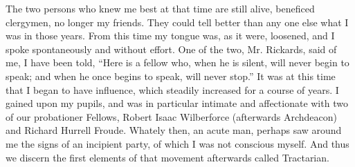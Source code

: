 The two persons who knew me best at that time are still alive,
beneficed clergymen, no longer my friends. They could tell better than
any one else what I was in those years. From this time my tongue was,
as it were, loosened, and I spoke spontaneously and without effort. One of the two, Mr.
Rickards, said of me, I have been
told, ``Here is a fellow who, when he is silent, will never begin to speak; and when he
once begins to speak, will never stop.'' It was at this time that I
began to have influence, which steadily increased for a course
of years. I gained upon my pupils, and was in particular intimate and
affectionate with two of our probationer Fellows, Robert Isaac
Wilberforce (afterwards Archdeacon) and Richard Hurrell Froude.
Whately then, an acute man, perhaps saw around me the signs of an
incipient party, of which I was not conscious myself. And thus
we discern the first elements of that movement afterwards called
Tractarian.

